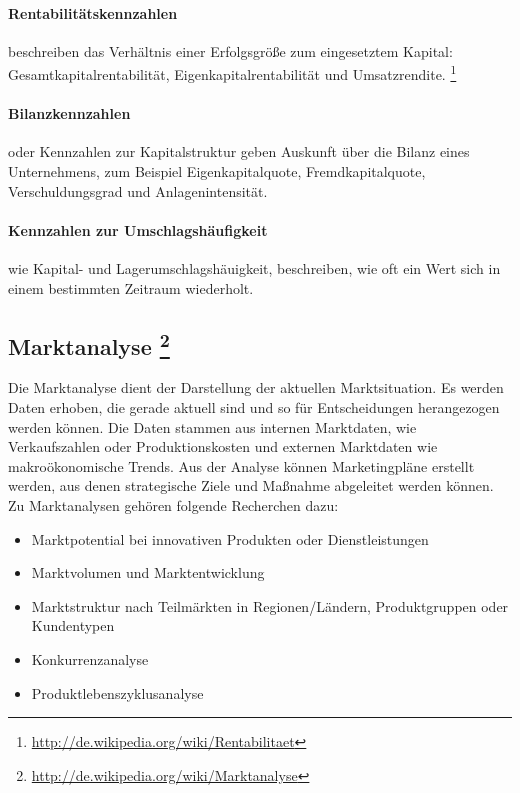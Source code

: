 \paragraph{Rentabilitätskennzahlen} beschreiben das Verhältnis einer Erfolgsgröße zum eingesetztem Kapital: Gesamtkapitalrentabilität, Eigenkapitalrentabilität und Umsatzrendite. \footnote{\url{http://de.wikipedia.org/wiki/Rentabilitaet}}

\paragraph{Bilanzkennzahlen} oder Kennzahlen zur Kapitalstruktur geben Auskunft über die Bilanz eines Unternehmens, zum Beispiel Eigenkapitalquote, Fremdkapitalquote, Verschuldungsgrad und Anlagenintensität.

\paragraph{Kennzahlen zur Umschlagshäufigkeit} wie Kapital- und Lagerumschlags\-häuigkeit, beschreiben, wie oft ein Wert sich in einem bestimmten Zeitraum wiederholt.
    
 



\subsection[Marktanalyse]{Marktanalyse \footnote{\url{http://de.wikipedia.org/wiki/Marktanalyse}}}

Die Marktanalyse dient der Darstellung der aktuellen Marktsituation. Es werden Daten erhoben, die gerade aktuell sind und so für Entscheidungen herangezogen werden können. Die Daten stammen aus internen Marktdaten, wie Verkaufszahlen oder Produktionskosten und externen Marktdaten wie makroökonomische Trends. Aus der Analyse können Marketingpläne erstellt werden, aus denen strategische Ziele und Maßnahme abgeleitet werden können.
\\
Zu Marktanalysen gehören folgende Recherchen dazu:
\begin{itemize}
	\item Marktpotential bei innovativen Produkten oder Dienstleistungen
	\item Marktvolumen und Marktentwicklung
	\item Marktstruktur nach Teilmärkten in Regionen/Ländern, Produktgruppen oder Kundentypen
	\item Konkurrenzanalyse
	\item Produktlebenszyklusanalyse 
\end{itemize}



